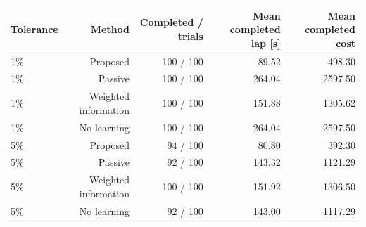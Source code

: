 \begin{tabular}{lrrrr}
\toprule
Tolerance & Method & Completed / trials & Mean completed lap [s] & Mean completed cost \\
\midrule
1\% & Proposed & 100 / 100 & 89.52 & 498.30 \\
1\% & Passive & 100 / 100 & 264.04 & 2597.50 \\
1\% & Weighted information & 100 / 100 & 151.88 & 1305.62 \\
1\% & No learning & 100 / 100 & 264.04 & 2597.50 \\
5\% & Proposed & 94 / 100 & 80.80 & 392.30 \\
5\% & Passive & 92 / 100 & 143.32 & 1121.29 \\
5\% & Weighted information & 100 / 100 & 151.92 & 1306.50 \\
5\% & No learning & 92 / 100 & 143.00 & 1117.29 \\
\bottomrule
\end{tabular}
